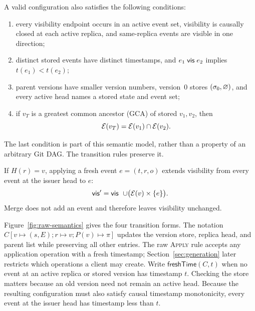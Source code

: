 A valid configuration also satisfies the following conditions:
\begin{enumerate}
\item every visibility endpoint occurs in an active event set, visibility is
causally closed at each active replica, and same-replica events are visible in
one direction;
\item distinct stored events have distinct timestamps, and
$e_1\mathrel{\mathsf{vis}} e_2$ implies $t(e_1)<t(e_2)$;
\item parent versions have smaller version numbers, version~0 stores
$(\sigma_0,\varnothing)$, and every active head names a stored state and event set;
\item if $v_T$ is a greatest common ancestor (GCA) of stored $v_1,v_2$, then
\[
  \mathcal E(v_T)=\mathcal E(v_1)\cap\mathcal E(v_2).
\]
\end{enumerate}
The last condition is part of this semantic model, rather than a property of an
arbitrary Git DAG. The transition rules preserve it.

If $H(r)=v$, applying a fresh event $e=(t,r,o)$ extends visibility from every
event at the issuer head to $e$:
\[
  \vis'\;=\;\vis\ \cup\bigl(\events(v)\times\{e\}\bigr).
\]
Merge does not add an event and therefore leaves visibility unchanged.

Figure~\ref{fig:raw-semantics} gives the four transition forms.
The notation $C[v\mapsto(s,E);r\mapsto v;P(v)\mapsto\pi]$ updates the version
store, replica head, and parent list while preserving all other entries.
The raw \textsc{Apply} rule accepts any application operation with a fresh
timestamp; Section~\ref{sec:generation} later restricts which operations a
client may create. Write $\mathsf{freshTime}(C,t)$ when no event at an active
replica or stored version has timestamp $t$. Checking the store matters because
an old version need not remain an active head. Because the resulting
configuration must also satisfy causal timestamp monotonicity, every event at
the issuer head has timestamp less than $t$.

